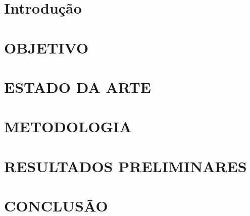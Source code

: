 \documentclass[
  a4paper,
  12pt,
  english,
  brazilian,
]{article}
\begin{document}
\section*{Introdução}%
\label{sect:intro}


\section*{OBJETIVO}\label{sect:obj}



\section*{ESTADO DA ARTE}\label{sect:estadoarte}



\section*{METODOLOGIA}\label{sect:metodologia}



\section*{RESULTADOS PRELIMINARES}\label{sect:resultados}



\section*{CONCLUSÃO}\label{sect:conclusao}



\newpage

\printbibliography
\end{document}
